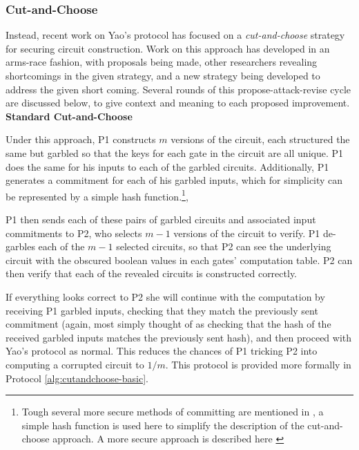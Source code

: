 \subsubsection{Cut-and-Choose}

Instead, recent work on Yao's protocol has focused on a \emph{cut-and-choose} strategy for securing circuit construction\cite{malkhi2004fairplay}. Work on this approach has developed in an arms-race fashion, with proposals being made, other researchers revealing shortcomings in the given strategy, and a new strategy being developed to address the given short coming. Several rounds of this propose-attack-revise cycle are discussed below, to give context and meaning to each proposed improvement.\\[.5em]

\noindent\textbf{Standard Cut-and-Choose}

Under this approach, \ac{P1} constructs $m$ versions of the circuit, each structured the same but garbled so that the keys for each gate in the circuit are all unique. \ac{P1} does the same for his inputs to each of the garbled circuits. Additionally, \ac{P1} generates a commitment for each of his garbled inputs, which for simplicity can be represented by a simple hash function.\footnote{Tough several more secure methods of committing are mentioned in \cite{lindell2007efficient}, a simple hash function is used here to simplify the description of the cut-and-choose approach.  A more secure approach is described here \cite{halevi1996practical}},

\ac{P1} then sends each of these pairs of garbled circuits and associated input commitments to \ac{P2}, who selects $m-1$ versions of the circuit to verify.  \ac{P1} de-garbles each of the $m-1$ selected circuits, so that \ac{P2} can see the underlying circuit with the obscured boolean values in each gates' computation table.  \ac{P2} can then verify that each of the revealed circuits is constructed correctly.

If everything looks correct to \ac{P2} she will continue with the computation by receiving \ac{P1} garbled inputs, checking that they match the previously sent commitment (again, most simply thought of as checking that the hash of the received garbled inputs matches the previously sent hash), and then proceed with Yao's protocol as normal. This reduces the chances of \ac{P1} tricking \ac{P2} into computing a corrupted circuit to $1/m$. This protocol is provided more formally in Protocol \ref{alg:cutandchoose-basic}.

